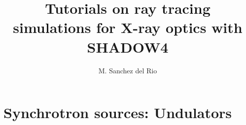 \documentclass{ol-softwaremanual}
\title{Tutorials on ray tracing simulations for X-ray optics with SHADOW4}
\author{M. Sanchez del Rio}
\begin{document}
\maketitle

\tableofcontents


\newpage
\section{Synchrotron sources: Undulators}


\end{document}
